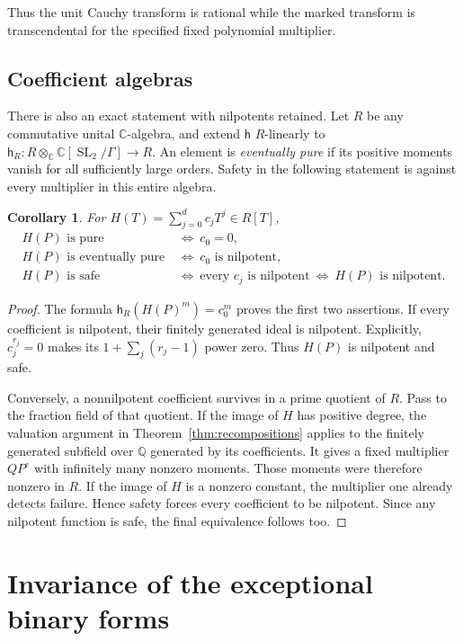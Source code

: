 \documentclass[11pt]{article}
\numberwithin{equation}{section}
\newtheorem{corollary}[theorem]{Corollary}
\theoremstyle{definition}
\theoremstyle{remark}
\newcommand{\C}{\mathbb C}
\newcommand{\Q}{\mathbb Q}
\newcommand{\h}{\mathsf h}
\newcommand{\SL}{\operatorname{SL}}
\begin{document}
Thus the unit Cauchy transform is rational while the marked transform
is transcendental for the specified fixed polynomial multiplier.

\subsection*{Coefficient algebras}

There is also an exact statement with nilpotents retained. Let $R$ be
any commutative unital $\C$-algebra, and extend $\h$ $R$-linearly to
$\h_R:R\otimes_{\C}\C[\SL_2/\Gamma]\to R$. An element is
\emph{eventually pure} if its positive moments vanish for all sufficiently
large orders. Safety in the following statement is against every
multiplier in this entire algebra.

\begin{corollary}\label{cor:coefficientrings}
For $H(T)=\sum_{j=0}^d c_jT^j\in R[T]$,
\[
 \begin{aligned}
 H(P)\text{ is pure}&\ \Longleftrightarrow\ c_0=0,\\
 H(P)\text{ is eventually pure}&\ \Longleftrightarrow\ c_0
          \text{ is nilpotent},\\
 H(P)\text{ is safe}&\ \Longleftrightarrow\ \text{every }c_j
          \text{ is nilpotent}
 \ \Longleftrightarrow\ H(P)\text{ is nilpotent}.
 \end{aligned}
\]
\end{corollary}
\begin{proof}
The formula $\h_R(H(P)^m)=c_0^m$ proves the first two assertions.
If every coefficient is nilpotent, their finitely generated ideal is
nilpotent. Explicitly, $c_j^{r_j}=0$ makes its
$1+\sum_j(r_j-1)$ power zero. Thus $H(P)$ is nilpotent and safe.

Conversely, a nonnilpotent coefficient survives in a prime quotient
of $R$. Pass to the fraction field of that quotient. If the image of
$H$ has positive degree, the valuation argument in
Theorem~\ref{thm:recompositions} applies to the finitely generated
subfield over $\Q$ generated by its coefficients. It gives a fixed
multiplier $QP^e$ with infinitely many nonzero
moments. Those moments were therefore nonzero in $R$. If the image of
$H$ is a nonzero constant, the multiplier one already detects failure.
Hence safety forces every coefficient to be nilpotent. Since any
nilpotent function is safe, the final equivalence follows too.
\end{proof}

\appendix
\section{Invariance of the exceptional binary forms}\label{app:invariance}
\end{document}
